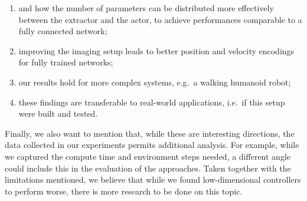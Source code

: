\begin{enumerate}
	\item and how the number of parameters can be distributed more effectively between
	the extractor and the actor, to achieve performances comparable to a fully connected network;
	\item improving the imaging setup leads to better position and velocity encodings for fully trained networks;
	\item our results hold for more complex systems, e.g.\ a walking humanoid robot;
	\item these findings are transferable to real-world applications, i.e.\ if this setup
	were built and tested.
\end{enumerate}

Finally, we also want to mention that, while these are interesting directions, the data collected
in our experiments permits additional analysis. For example,
while we captured the compute time and environment steps needed, a different angle could include
this in the evaluation of the approaches. Taken together with the limitations mentioned, we believe
that while we found low-dimensional controllers to perform worse,
there is more research to be done on this topic.